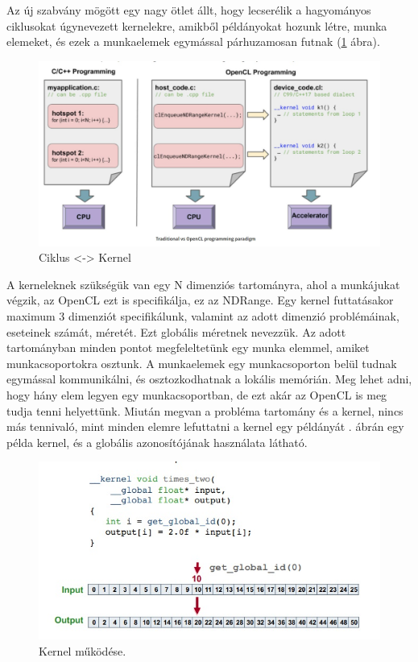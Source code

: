 Az új szabvány mögött egy nagy ötlet állt, hogy lecserélik a hagyományos ciklusokat úgynevezett kernelekre, amikből példányokat hozunk létre, munka elemeket, és ezek a munkaelemek egymással párhuzamosan futnak (\ref{fig:loopVsKernel} ábra).

\begin{figure}[h]
\centering
\includegraphics[scale=0.4]{images/loopvskernel.jpg}
\caption{Ciklus <-> Kernel \cite{opencl}}
\label{fig:loopVsKernel}
\end{figure}

A kerneleknek szükségük van egy N dimenziós tartományra, ahol a munkájukat végzik, az OpenCL  ezt is specifikálja, ez az NDRange. Egy kernel futtatásakor maximum 3 dimenziót specifikálunk, valamint az adott dimenzió problémáinak, eseteinek számát, méretét. Ezt globális méretnek nevezzük. Az adott tartományban minden pontot megfeleltetünk egy munka elemmel, amiket munkacsoportokra osztunk. A munkaelemek egy munkacsoporton belül tudnak egymással kommunikálni, és osztozkodhatnak a lokális memórián. Meg lehet adni, hogy hány elem legyen egy munkacsoportban, de ezt akár az OpenCL is meg tudja tenni helyettünk. Miután megvan a probléma tartomány és a  kernel, nincs más tennivaló, mint minden elemre lefuttatni a kernel egy példányát \cite{opencl_origin_range}.  ábrán egy példa kernel, és a globális azonosítójának használata látható.
 
\begin{figure}[h]
\centering
\includegraphics[scale=0.7]{images/kernel.jpg}
\caption{Kernel működése. \cite{opencl_origink}}
\label{fig:kernel}
\end{figure}

